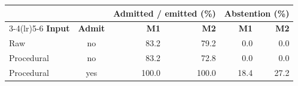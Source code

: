 \begin{tabular}{@{}lcrrrr@{}}
\toprule
 & & \multicolumn{2}{c}{\textbf{Admitted / emitted (\%)}} & \multicolumn{2}{c}{\textbf{Abstention (\%)}} \\
\cmidrule(lr){3-4}\cmidrule(lr){5-6}
\textbf{Input} & \textbf{Admit} & \textbf{M1} & \textbf{M2} & \textbf{M1} & \textbf{M2} \\
\midrule
Raw & no & 83.2 & 79.2 & 0.0 & 0.0 \\
Procedural & no & 83.2 & 72.8 & 0.0 & 0.0 \\
Procedural & yes & 100.0 & 100.0 & 18.4 & 27.2 \\
\bottomrule
\end{tabular}
